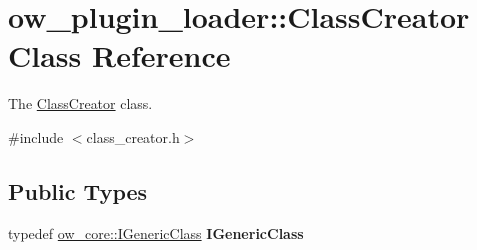\hypertarget{classow__plugin__loader_1_1ClassCreator}{}\section{ow\+\_\+plugin\+\_\+loader\+:\+:Class\+Creator Class Reference}
\label{classow__plugin__loader_1_1ClassCreator}


The \hyperlink{classow__plugin__loader_1_1ClassCreator}{Class\+Creator} class.  




{\ttfamily \#include $<$class\+\_\+creator.\+h$>$}

\subsection*{Public Types}
\begin{DoxyCompactItemize}
\item 
typedef \hyperlink{classow__core_1_1IGenericClass}{ow\+\_\+core\+::\+I\+Generic\+Class} {\bfseries I\+Generic\+Class}\hypertarget{classow__plugin__loader_1_1ClassCreator_ac2324a34c491c3e3edf855ff06453531}{}\label{classow__plugin__loader_1_1ClassCreator_ac2324a34c491c3e3edf855ff06453531}

\end{DoxyCompactItemize}
